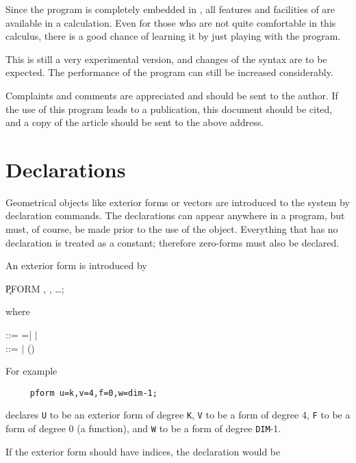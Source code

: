 Since the program is completely embedded in {\REDUCE}, all features and
facilities of {\REDUCE} are available in a calculation.  Even for those
who are not quite comfortable in this calculus, there is a good chance
of learning it by just playing with the program.

This is still a very experimental version, and changes of the syntax
are to be expected. The performance of the program can still be
increased considerably.

Complaints and comments are appreciated and should be sent to the author.
If the use of this program leads to a publication, this document should
be cited, and a copy of the article should be sent to the above address.

\section{Declarations}

Geometrical objects like exterior forms or vectors are introduced to the
system by declaration commands.  The declarations can appear anywhere in
a program, but must, of course, be made prior to the use of the object.
Everything that has no declaration is treated as a constant; therefore
zero-forms must also be declared.

An exterior form is introduced by\label{PFORM} 

\hspace*{2em} \k{PFORM} , , \ldots;

where

\begin{tabbing}
 ::= =| $\mid$  \\
 ::=  $\mid$ ()
\end{tabbing}

For example

\begin{verbatim}
     pform u=k,v=4,f=0,w=dim-1;
\end{verbatim}

declares {\tt U} to be an exterior form of degree {\tt K}, {\tt V} to be a
form of degree 4, {\tt F} to be a form of degree 0 (a function), and {\tt W}
to be a form of degree {\tt DIM}-1.

If the exterior form should have indices, the declaration would be


